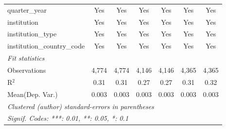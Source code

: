 \begin{tabular}{lcccccc}
   quarter\_year                      & Yes     & Yes      & Yes     & Yes      & Yes     & Yes\\  
   institution                        & Yes     & Yes      & Yes     & Yes      & Yes     & Yes\\  
   institution\_type                  & Yes     & Yes      & Yes     & Yes      & Yes     & Yes\\  
   institution\_country\_code         & Yes     & Yes      & Yes     & Yes      & Yes     & Yes\\  
   \midrule
   \emph{Fit statistics}\\
   Observations                       & 4,774   & 4,774    & 4,146   & 4,146    & 4,365   & 4,365\\  
   R$^2$                              & 0.31    & 0.31     & 0.27    & 0.27     & 0.31    & 0.32\\  
Mean(Dep. Var.) & 0.003 & 0.003 & 0.003 & 0.003 & 0.003 & 0.003 \\
   \midrule \midrule
   \multicolumn{7}{l}{\emph{Clustered (author) standard-errors in parentheses}}\\
   \multicolumn{7}{l}{\emph{Signif. Codes: ***: 0.01, **: 0.05, *: 0.1}}\\
\end{tabular}
\par\endgroup
